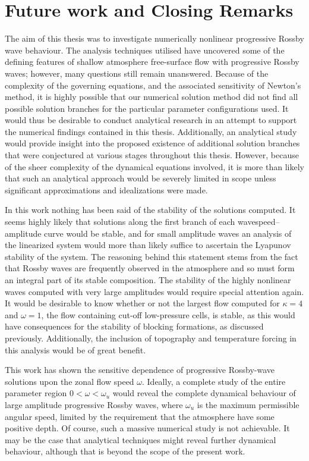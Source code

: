 \section{Future work and Closing Remarks}
The aim of this thesis was to investigate numerically nonlinear progressive Rossby wave behaviour. The analysis techniques utilised have uncovered some of the defining features of shallow atmosphere free-surface flow with progressive Rossby waves; however, many questions still remain unanswered. Because of the complexity of the governing equations, and the associated sensitivity of Newton's method, it is highly possible that our numerical solution method did not find all possible solution branches for the particular parameter configurations used. It would thus be desirable to conduct analytical research in an attempt to support the numerical findings contained in this thesis. Additionally, an analytical study would provide insight into the proposed existence of additional solution branches that were conjectured at various stages throughout this thesis. However, because of the sheer complexity of the dynamical equations involved, it is more than likely that such an analytical approach would be severely limited in scope unless significant approximations and idealizations were made.

In this work nothing has been said of the stability of the solutions computed. It seems highly likely that solutions along the first branch of each wavespeed--amplitude curve would be stable, and for small amplitude waves an analysis of the linearized system would more than likely suffice to ascertain the Lyapunov stability of the system. The reasoning behind this statement stems from the fact that Rossby waves are frequently observed in the atmosphere and so must form an integral part of its stable composition. The stability of the highly nonlinear waves computed with very large amplitudes would require special attention again. It would be desirable to know whether or not the largest flow computed for $\kappa=4$ and $\omega=1$, the flow containing cut-off low-pressure cells, is stable, as this would have consequences for the stability of blocking formations, as discussed previously. Additionally, the inclusion of topography and temperature forcing in this analysis would be of great benefit.

This work has shown the sensitive dependence of progressive Rossby-wave solutions upon the zonal flow speed $\omega$. Ideally, a complete study of the entire parameter region $0<\omega<\omega_u$ would reveal the complete dynamical behaviour of large amplitude progressive Rossby waves, where $\omega_u$ is the maximum permissible angular speed, limited by the requirement that the atmosphere have some positive depth. Of course, such a massive numerical study is not achievable. It may be the case that analytical techniques might reveal further dynamical behaviour, although that is beyond the scope of the present work.

